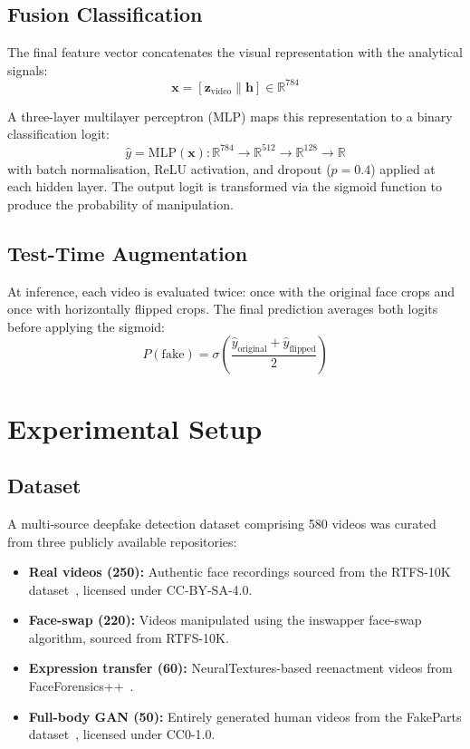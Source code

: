 \documentclass[11pt, twocolumn]{article}
\begin{document}
\subsection{Fusion Classification}

The final feature vector concatenates the visual representation with the analytical signals:
\begin{equation}
\mathbf{x} = [\mathbf{z}_{\text{video}} \| \mathbf{h}] \in \mathbb{R}^{784}
\end{equation}

A three-layer multilayer perceptron (MLP) maps this representation to a binary classification logit:
\begin{equation}
\hat{y} = \text{MLP}(\mathbf{x}): \mathbb{R}^{784} \rightarrow \mathbb{R}^{512} \rightarrow \mathbb{R}^{128} \rightarrow \mathbb{R}
\end{equation}
with batch normalisation, ReLU activation, and dropout ($p=0.4$) applied at each hidden layer. The output logit is transformed via the sigmoid function to produce the probability of manipulation.

\subsection{Test-Time Augmentation}

At inference, each video is evaluated twice: once with the original face crops and once with horizontally flipped crops. The final prediction averages both logits before applying the sigmoid:
\begin{equation}
P(\text{fake}) = \sigma\left(\frac{\hat{y}_{\text{original}} + \hat{y}_{\text{flipped}}}{2}\right)
\end{equation}

\section{Experimental Setup}

\subsection{Dataset}

A multi-source deepfake detection dataset comprising 580 videos was curated from three publicly available repositories:

\begin{itemize}
\item \textbf{Real videos (250):} Authentic face recordings sourced from the RTFS-10K dataset~\cite{rtfs10k}, licensed under CC-BY-SA-4.0.
\item \textbf{Face-swap (220):} Videos manipulated using the inswapper face-swap algorithm, sourced from RTFS-10K.
\item \textbf{Expression transfer (60):} NeuralTextures-based reenactment videos from FaceForensics++~\cite{rossler2019faceforensics}.
\item \textbf{Full-body GAN (50):} Entirely generated human videos from the FakeParts dataset~\cite{fakeparts}, licensed under CC0-1.0.
\end{itemize}
\end{document}
